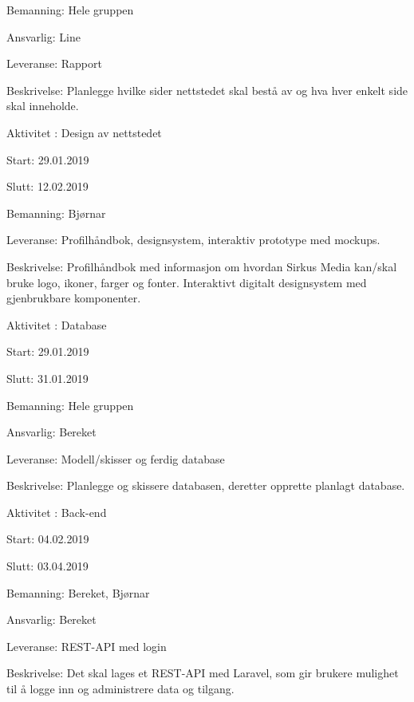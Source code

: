 \documentclass[11pt,a4paper]{report}
\begin{document}
\begin{compactdesc}
\begin{compactitem}
	\item Bemanning: Hele gruppen
	\item Ansvarlig: Line
	\item Leveranse: Rapport
	\item Beskrivelse: Planlegge hvilke sider nettstedet skal bestå av og hva hver enkelt side skal inneholde.
	\addtocounter{aktivitetTeller}{1}
	\end{compactitem}
	\item [Aktivitet \arabic{aktivitetTeller}:] Design av nettstedet
	\begin{compactitem}
	\item Start: 29.01.2019
	\item Slutt: 12.02.2019
	\item Bemanning: Bjørnar
	\item Leveranse: Profilhåndbok, designsystem, interaktiv prototype med mockups. 
	\item Beskrivelse: Profilhåndbok med informasjon om hvordan Sirkus Media kan/skal bruke logo, ikoner, farger og fonter. Interaktivt digitalt designsystem med gjenbrukbare komponenter.
	\addtocounter{aktivitetTeller}{1}
	\end{compactitem}
	\item [Aktivitet \arabic{aktivitetTeller}:] Database 
	\begin{compactitem}
	\item Start: 29.01.2019
	\item Slutt: 31.01.2019
	\item Bemanning: Hele gruppen
	\item Ansvarlig: Bereket
	\item Leveranse: Modell/skisser og ferdig database
	\item Beskrivelse: Planlegge og skissere databasen, deretter opprette planlagt database.
	\addtocounter{aktivitetTeller}{1}
	\end{compactitem}
	\item [Aktivitet \arabic{aktivitetTeller}:] Back-end
	\begin{compactitem}
	\item Start: 04.02.2019
	\item Slutt: 03.04.2019
	\item Bemanning: Bereket, Bjørnar
	\item Ansvarlig: Bereket
	\item Leveranse: REST-API med login
	\item Beskrivelse: Det skal lages et REST-API med Laravel, som gir brukere mulighet til å logge inn og administrere data og tilgang.

\end{compactitem}
\end{compactdesc}
\end{document}
